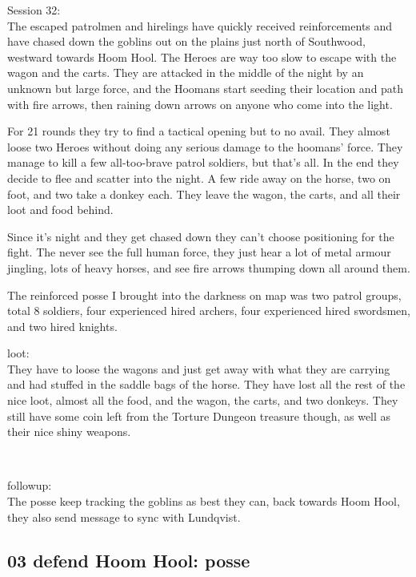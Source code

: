 \forceindent Session 32:\\                                              %
The escaped patrolmen and hirelings have quickly received reinforcements and have chased down the goblins out on the plains just north of Southwood, westward towards Hoom Hool. The Heroes are way too slow to escape with the wagon and the carts. They are attacked in the middle of the night by an unknown but large force, and the Hoomans start seeding their location and path with fire arrows, then raining down arrows on anyone who come into the light.

For 21 rounds they try to find a tactical opening but to no avail. They almost loose two Heroes without doing any serious damage to the hoomans' force. They manage to kill a few all-too-brave patrol soldiers, but that's all. In the end they decide to flee and scatter into the night. A few ride away on the horse, two on foot, and two take a donkey each. They leave the wagon, the carts, and all their loot and food behind.

\begin{readoutloud}
Since it's night and they get chased down they can't choose positioning for the fight. The never see the full human force, they just hear a lot of metal armour jingling, lots of heavy horses, and see fire arrows thumping down all around them.

The reinforced posse I brought into the darkness on map was two patrol groups, total 8 soldiers, four experienced hired archers, four experienced hired swordsmen, and two hired knights.
\end{readoutloud}


loot:\\
They have to loose the wagons and just get away with what they are carrying and had stuffed in the saddle bags of the horse. They have lost all the rest of the nice loot, almost all the food, and the wagon, the carts, and two donkeys. They still have some coin left from the Torture Dungeon treasure though, as well as their nice shiny weapons.

\

followup:\\
The posse keep tracking the goblins as best they can, back towards Hoom Hool, they also send message to sync with Lundqvist.


\subsection*{03 defend Hoom Hool: posse}

